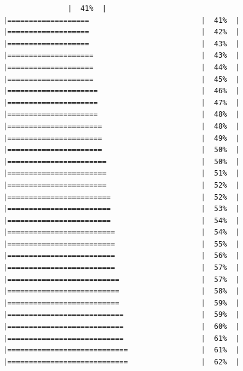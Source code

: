 \documentclass[
  krantz2]{krantz}
\begin{document}
\begin{verbatim}
               |  41%  |                                                     |===================                          |  41%  |                                                     |===================                          |  42%  |                                                     |===================                          |  43%  |                                                     |====================                         |  43%  |                                                     |====================                         |  44%  |                                                     |====================                         |  45%  |                                                     |=====================                        |  46%  |                                                     |=====================                        |  47%  |                                                     |=====================                        |  48%  |                                                     |======================                       |  48%  |                                                     |======================                       |  49%  |                                                     |======================                       |  50%  |                                                     |=======================                      |  50%  |                                                     |=======================                      |  51%  |                                                     |=======================                      |  52%  |                                                     |========================                     |  52%  |                                                     |========================                     |  53%  |                                                     |========================                     |  54%  |                                                     |=========================                    |  54%  |                                                     |=========================                    |  55%  |                                                     |=========================                    |  56%  |                                                     |=========================                    |  57%  |                                                     |==========================                   |  57%  |                                                     |==========================                   |  58%  |                                                     |==========================                   |  59%  |                                                     |===========================                  |  59%  |                                                     |===========================                  |  60%  |                                                     |===========================                  |  61%  |                                                     |============================                 |  61%  |                                                     |============================                 |  62%  |                                                     
\end{verbatim}
\end{document}
